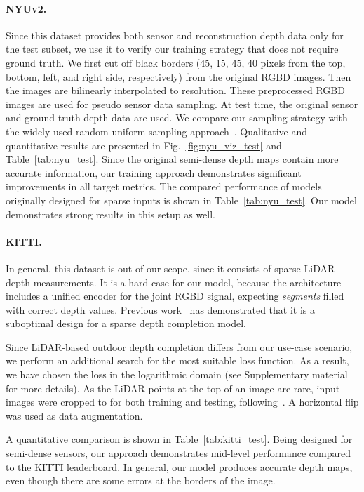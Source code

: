 \documentclass[final]{cvpr}
\begin{document}
    \paragraph{NYUv2.} Since this dataset provides both sensor and reconstruction depth data only for the test subset, we use it to verify our training strategy that does not require ground truth. We first cut off black borders (45, 15, 45, 40 pixels from the top, bottom, left, and right side, respectively) from the original  RGBD images. Then the images are bilinearly interpolated to  resolution. These preprocessed RGBD images are used for pseudo sensor data sampling. At test time, the original sensor and ground truth depth data are used. We compare our sampling strategy with the widely used random uniform sampling approach~\cite{Ma2017SparseToDense, guidenet}. Qualitative and quantitative results are presented in Fig.~\ref{fig:nyu_viz_test} and Table~\ref{tab:nyu_test}. Since the original semi-dense depth maps contain more accurate information, our training approach demonstrates significant improvements in all target metrics. The compared performance of models originally designed for sparse inputs is shown in Table~\ref{tab:nyu_test}. Our model demonstrates strong results in this setup as well.


    \paragraph{KITTI.} In general, this dataset is out of our scope, since it consists of sparse LiDAR depth measurements. It is a hard case for our model, because the architecture includes a unified encoder for the joint RGBD signal, expecting \textit{segments} filled with correct depth values. Previous work~\cite{msg_chn} has demonstrated that it is a suboptimal design for a sparse depth completion model.  
    
    Since LiDAR-based outdoor depth completion differs from our use-case scenario, we perform an additional search for the most suitable loss function. As a result, we have chosen the  loss in the logarithmic domain (see Supplementary material for more details). 
As the LiDAR points at the top of an image are rare, input images were cropped to  for both training and testing, following~\cite{guidenet}. A horizontal flip was used as data augmentation.
    
    A quantitative comparison is shown in Table~\ref{tab:kitti_test}. Being designed for semi-dense sensors, our approach demonstrates mid-level performance compared to the KITTI leaderboard. In general, our model produces accurate depth maps, even though there are some errors at the borders of the image.
    
\end{document}
